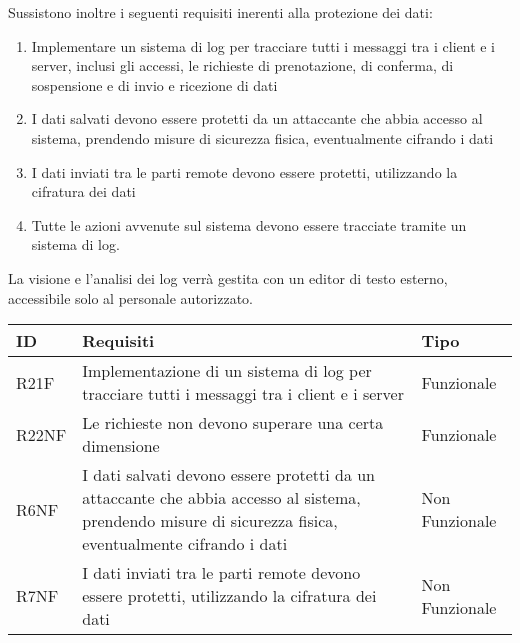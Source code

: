 Sussistono inoltre i seguenti requisiti inerenti alla protezione dei dati:
\begin{enumerate}
  \item Implementare un sistema di log per tracciare tutti i messaggi tra i client e i server, inclusi gli accessi, le richieste di prenotazione, di conferma, di sospensione e di invio e ricezione di dati
  \item I dati salvati devono essere protetti da un attaccante che abbia accesso al sistema, prendendo misure di sicurezza fisica, eventualmente cifrando i dati
  \item I dati inviati tra le parti remote devono essere protetti, utilizzando la cifratura dei dati
  \item Tutte le azioni avvenute sul sistema devono essere tracciate
        tramite un sistema di log.
\end{enumerate}

\raggedright{La visione e l'analisi dei log verrà gestita
  con un editor di testo esterno, accessibile solo al personale
  autorizzato.}
\hfill \break

\begin{tabular} {|P{3cm}|P{10cm}|P{3cm}|}
  \hline
  \textbf{ID}                       & \textbf{Requisiti}                                                  & \textbf{Tipo} \\
  \hline
  R21F                              & Implementazione di un sistema di log per tracciare tutti i messaggi
  tra i client e i server           & Funzionale                                                                          \\
  \hline
  R22NF                             & Le richieste non devono superare una certa dimensione               & Funzionale    \\
  \hline
  R6NF                              & I dati salvati devono essere protetti da un attaccante che abbia
  accesso al sistema, prendendo misure di sicurezza fisica, eventualmente
  cifrando i dati                   & Non Funzionale                                                                      \\
  \hline
  R7NF                              & I dati inviati tra le parti remote devono essere protetti,
  utilizzando la cifratura dei dati & Non Funzionale                                                                      \\
  \hline
\end{tabular}
